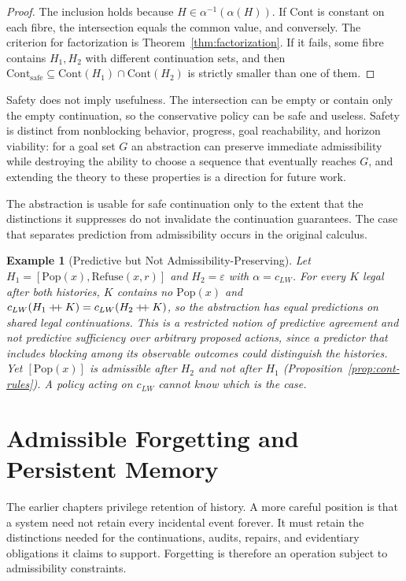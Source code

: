 \documentclass[12pt,oneside,openany]{book}
\theoremstyle{spherepop}
\theoremstyle{remarkstyle}
\newtheorem{example}[definition]{Example}
\newcommand{\Pop}{\mathrm{Pop}}
\newcommand{\Rfuse}{\mathrm{Refuse}}
\newcommand{\hconcat}{\mathbin{+\mkern-5mu+}}
\begin{document}
\begin{proof}
The inclusion holds because $H\in\alpha^{-1}(\alpha(H))$. If $\mathrm{Cont}$ is constant on each fibre, the intersection equals the common value, and conversely. The criterion for factorization is Theorem~\ref{thm:factorization}. If it fails, some fibre contains $H_1,H_2$ with different continuation sets, and then $\mathrm{Cont}_{\mathrm{safe}}\subseteq\mathrm{Cont}(H_1)\cap\mathrm{Cont}(H_2)$ is strictly smaller than one of them.
\end{proof}

Safety does not imply usefulness. The intersection can be empty or contain only the empty continuation, so the conservative policy can be safe and useless. Safety is distinct from nonblocking behavior, progress, goal reachability, and horizon viability: for a goal set $G$ an abstraction can preserve immediate admissibility while destroying the ability to choose a sequence that eventually reaches $G$, and extending the theory to these properties is a direction for future work.

The abstraction is usable for safe continuation only to the extent that the distinctions it suppresses do not invalidate the continuation guarantees. The case that separates prediction from admissibility occurs in the original calculus.

\begin{example}[Predictive but Not Admissibility-Preserving]
Let $H_1=[\Pop(x),\Rfuse(x,r)]$ and $H_2=\varepsilon$ with $\alpha=c_{LW}$. For every $K$ legal after both histories, $K$ contains no $\Pop(x)$ and $c_{LW}(H_1\hconcat K)=c_{LW}(H_2\hconcat K)$, so the abstraction has equal predictions on shared legal continuations. This is a restricted notion of predictive agreement and not predictive sufficiency over arbitrary proposed actions, since a predictor that includes blocking among its observable outcomes could distinguish the histories. Yet $[\Pop(x)]$ is admissible after $H_2$ and not after $H_1$ (Proposition~\ref{prop:cont-rules}). A policy acting on $c_{LW}$ cannot know which is the case.
\end{example}

\chapter{Admissible Forgetting and Persistent Memory}
\label{ch:forgetting}

The earlier chapters privilege retention of history. A more careful position is that a system need not retain every incidental event forever. It must retain the distinctions needed for the continuations, audits, repairs, and evidentiary obligations it claims to support. Forgetting is therefore an operation subject to admissibility constraints.
\end{document}
